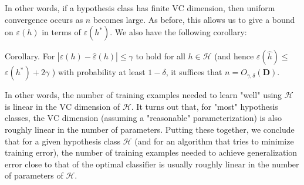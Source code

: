 \documentclass[10pt]{article}
\begin{document}
In other words, if a hypothesis class has finite \(\mathrm{VC}\) dimension, then uniform convergence occurs as \(n\) becomes large. As before, this allows us to give a bound on \(\varepsilon(h)\) in terms of \(\varepsilon\left(h^{*}\right)\). We also have the following corollary:

Corollary. For \(|\varepsilon(h)-\hat{\varepsilon}(h)| \leq \gamma\) to hold for all \(h \in \mathcal{H}\) (and hence \(\varepsilon(\hat{h}) \leq\) \(\varepsilon\left(h^{*}\right)+2 \gamma\) ) with probability at least \(1-\delta\), it suffices that \(n=O_{\gamma, \delta}(\mathbf{D})\).

In other words, the number of training examples needed to learn "well" using \(\mathcal{H}\) is linear in the \(\mathrm{VC}\) dimension of \(\mathcal{H}\). It turns out that, for "most" hypothesis classes, the \(\mathrm{VC}\) dimension (assuming a "reasonable" parameterization) is also roughly linear in the number of parameters. Putting these together, we conclude that for a given hypothesis class \(\mathcal{H}\) (and for an algorithm that tries to minimize training error), the number of training examples needed to achieve generalization error close to that of the optimal classifier is usually roughly linear in the number of parameters of \(\mathcal{H}\).
\end{document}
